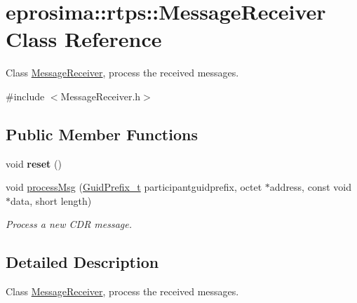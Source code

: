 \hypertarget{classeprosima_1_1rtps_1_1_message_receiver}{\section{eprosima\-:\-:rtps\-:\-:\-Message\-Receiver \-Class \-Reference}
\label{classeprosima_1_1rtps_1_1_message_receiver}
}


\-Class \hyperlink{classeprosima_1_1rtps_1_1_message_receiver}{\-Message\-Receiver}, process the received messages.  




{\ttfamily \#include $<$\-Message\-Receiver.\-h$>$}

\subsection*{\-Public \-Member \-Functions}
\begin{DoxyCompactItemize}
\item 
\hypertarget{classeprosima_1_1rtps_1_1_message_receiver_ae14ccc49b3e685ae3bc57fa2f0c8a16a}{void {\bfseries reset} ()}\label{classeprosima_1_1rtps_1_1_message_receiver_ae14ccc49b3e685ae3bc57fa2f0c8a16a}

\item 
void \hyperlink{classeprosima_1_1rtps_1_1_message_receiver_a18d194588c0210f5426db3e3ee3c23f6}{process\-Msg} (\hyperlink{structeprosima_1_1rtps_1_1_guid_prefix__t}{\-Guid\-Prefix\-\_\-t} participantguidprefix, octet $\ast$address, const void $\ast$data, short length)
\begin{DoxyCompactList}\small\item\em \-Process a new \-C\-D\-R message. \end{DoxyCompactList}\end{DoxyCompactItemize}


\subsection{\-Detailed \-Description}
\-Class \hyperlink{classeprosima_1_1rtps_1_1_message_receiver}{\-Message\-Receiver}, process the received messages. 

